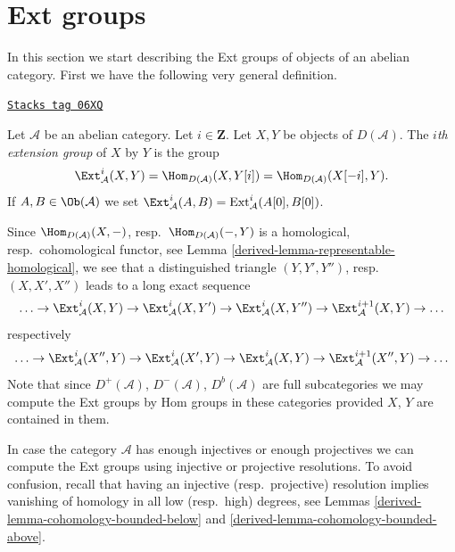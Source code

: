 \section{Ext groups}
\label{derived-section-ext}
In this section we start describing the Ext groups of objects
of an abelian category. First we have the following very general
definition.

\begin{definition}[Ext]
\label{derived-definition-ext}
\href{https://stacks.math.columbia.edu/tag/06XQ}{\texttt{Stacks tag 06XQ}}

Let $\mathcal{A}$ be an abelian category. Let $i \in \mathbf{Z}$. Let
$X, Y$ be objects of $D(\mathcal{A})$. The {\it $i$th extension group}
of $X$ by $Y$ is the group
$$
\Ext^i_\mathcal{A}(X, Y) =
\Hom_{D(\mathcal{A})}(X, Y[i]) =
\Hom_{D(\mathcal{A})}(X[-i], Y).
$$
If $A, B \in \Ob(\mathcal{A})$ we set
$\Ext^i_\mathcal{A}(A, B) = \text{Ext}^i_\mathcal{A}(A[0], B[0])$.
\end{definition}

Since $\Hom_{D(\mathcal{A})}(X, -)$,
resp.\ $\Hom_{D(\mathcal{A})}(-, Y)$ is a homological,
resp.\ cohomological functor, see
Lemma \ref{derived-lemma-representable-homological},
we see that a distinguished triangle $(Y, Y', Y'')$,
resp.\ $(X, X', X'')$ leads to a long exact sequence
$$
\ldots \to
\Ext^i_\mathcal{A}(X, Y) \to
\Ext^i_\mathcal{A}(X, Y') \to
\Ext^i_\mathcal{A}(X, Y'') \to
\Ext^{i + 1}_\mathcal{A}(X, Y) \to \ldots
$$
respectively
$$
\ldots \to
\Ext^i_\mathcal{A}(X'', Y) \to
\Ext^i_\mathcal{A}(X', Y) \to
\Ext^i_\mathcal{A}(X, Y) \to
\Ext^{i + 1}_\mathcal{A}(X'', Y) \to \ldots
$$
Note that since $D^+(\mathcal{A})$, $D^-(\mathcal{A})$, $D^b(\mathcal{A})$
are full subcategories we may compute the Ext groups by Hom groups
in these categories provided $X$, $Y$ are contained in them.

\medskip\noindent
In case the category $\mathcal{A}$ has enough injectives or enough
projectives we can compute the Ext groups using injective or
projective resolutions. To avoid confusion, recall that having an
injective (resp.\ projective) resolution implies vanishing of homology
in all low (resp.\ high) degrees, see
Lemmas \ref{derived-lemma-cohomology-bounded-below} and
\ref{derived-lemma-cohomology-bounded-above}.

